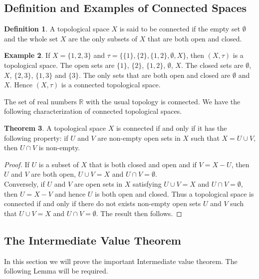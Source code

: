 \documentclass[11pt,a4paper]{article}
\theoremstyle{definition}
\newtheorem{thm}{Theorem}[subsection]
\newtheorem{defn}[thm]{Definition}
\newtheorem{exa}[thm]{Example}
\begin{document}
\subsection{Definition and Examples of Connected Spaces}



\begin{defn}
A topological space $X$ is said to be connected if  the empty set $\emptyset$ and the whole set $X$ are the only subsets of $X$ that are both open and closed.
\end{defn}



\begin{exa}
If $X=\{1,2,3\}$ and $\tau=\{\{1\},\{2\},\{1,2\},\emptyset,X\}$, then $(X,\tau)$ is a topological space. The open sets are $\{1\}$, $\{2\}$, $\{1,2\}$, $\emptyset$, $X$. The closed sets are $\emptyset$, $X$, $\{2,3\}$, $\{1,3\}$ and $\{3\}$. The only sets that are both open and closed are $\emptyset$ and $X$. Hence $(X,\tau)$ is a connected topological space.
\end{exa}

The set of real numbers $\mathbb{R}$ with the usual topology is connected. We have the following characterization of connected topological spaces.


\begin{thm}
A topological space $X$ is connected if and only if it has the following property: if $U$ and $V$ are non-empty open sets in $X$ such that $X=U\cup V$, then $U\cap V$ is non-empty.
\end{thm}

\begin{proof}
If $U$ is a subset of $X$ that is both closed and open and if $V=X-U$, then $U$ and $V$ are both open, $U\cup V=X$ and $U\cap V=\emptyset$.\\ 
Conversely, if $U$ and $V$ are open sets in $X$ satisfying $U\cup V=X$ and $U\cap V=\emptyset$, then $U=X-V$ and hence $U$ is both open and closed. Thus a topological space is connected if and only if there do not exists non-empty open sets $U$ and $V$ such that $U\cup V=X$ and $U\cap V=\emptyset$. The result then follows.
\end{proof}









\subsection{The Intermediate Value Theorem}
In this section we will prove the important Intermediate value theorem. The following Lemma will be required.
\end{document}
